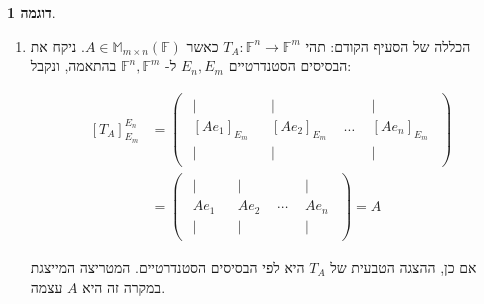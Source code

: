 \documentclass[12pt]{report}
\theoremstyle{plain}
\theoremstyle{definition}
\newtheorem{example}{דוגמה}[chapter]
\newcommand{\F}{\mathbb{F}}
\newcommand{\M}{\mathbb{M}}
\newcommand{\0}{\mathbf{0}}
\begin{document}
\begin{example}
\begin{enumerate}[label=\alph*.]
\item 
הכללה של הסעיף הקודם: תהי
$T_A:\F^n\to\F^m$
כאשר
$A\in\M_{m\times n}(\F)$.
ניקח את הבסיסים הסטנדרטיים
$E_n,E_m$
ל-
$\F^n,\F^m$
בהתאמה, ונקבל:

$$
\begin{aligned}
[T_A]_{E_m}^{E_n}&=\begin{pmatrix}
\begin{array}{c}
|\\[-0.4ex]
[Ae_1]_{E_m}\\[-0.4ex]
|
\end{array}
&
\begin{array}{c}
|\\[-0.4ex]
[Ae_2]_{E_m}\\[-0.4ex]
|
\end{array}
&
\cdots
&
\begin{array}{c}
|\\[-0.4ex]
[Ae_n]_{E_m}\\[-0.4ex]
|
\end{array}
\end{pmatrix}\\
&=\begin{pmatrix}
\begin{array}{c}
|\\[-0.4ex]
Ae_1\\[-0.4ex]
|
\end{array}
&
\begin{array}{c}
|\\[-0.4ex]
Ae_2\\[-0.4ex]
|
\end{array}
&
\cdots
&
\begin{array}{c}
|\\[-0.4ex]
Ae_n\\[-0.4ex]
|
\end{array}
\end{pmatrix}=A
\end{aligned}
$$

אם כן, ההצגה הטבעית של 
$T_A$
היא לפי הבסיסים הסטנדרטיים. המטריצה המייצגת במקרה זה היא 
$A$
עצמה.



\end{enumerate}
\end{example}
\end{document}
